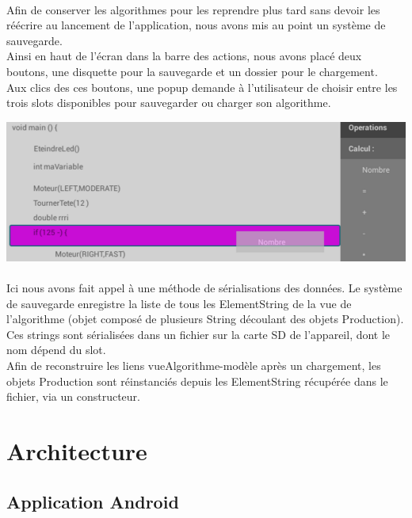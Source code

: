 \documentclass[a4paper]{article}
\begin{document}
\paragraph{}
Afin de conserver les algorithmes pour les reprendre plus tard sans devoir les réécrire au lancement de l’application, nous avons mis au point un système de sauvegarde.\\
Ainsi en haut de l’écran dans la barre des actions, nous avons placé deux boutons,
une disquette pour la sauvegarde et un dossier pour le chargement.\\
Aux clics des ces boutons, une popup demande à l’utilisateur de choisir entre les trois slots disponibles pour sauvegarder ou charger son algorithme.

\begin{center}
\includegraphics[scale=0.4]{img/edit_4.png}
\end{center}

\paragraph{}
Ici nous avons fait appel à une méthode de sérialisations des données. Le système de sauvegarde enregistre la liste de tous les ElementString de la vue de l'algorithme (objet composé de plusieurs String découlant des objets Production). Ces strings sont sérialisées dans un fichier sur la carte SD de l’appareil, dont le nom dépend du slot.\\
Afin de reconstruire les liens vueAlgorithme-modèle après un chargement, les objets Production sont réinstanciés depuis les ElementString récupérée dans le fichier, via un constructeur.

\section{Architecture}

\subsection{Application  Android}
\end{document}
